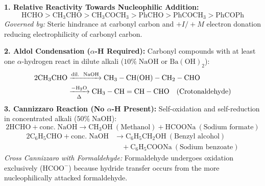 \documentclass[10pt,twoside,openright]{book}
\begin{document}
\begin{formulabox}
\textbf{1. Relative Reactivity Towards Nucleophilic Addition:}
\begin{equation}
  \mathrm{HCHO} > \mathrm{CH_3CHO} > \mathrm{CH_3COCH_3} > \mathrm{PhCHO} > \mathrm{PhCOCH_3} > \mathrm{PhCOPh}
\end{equation}
\textit{Governed by:} Steric hindrance at carbonyl carbon and $+I / +M$ electron donation reducing electrophilicity of carbonyl carbon.

\textbf{2. Aldol Condensation ($\alpha$-H Required):}
Carbonyl compounds with at least one $\alpha$-hydrogen react in dilute alkali ($10\%\; \mathrm{NaOH}$ or $\mathrm{Ba(OH)}_2$):
\begin{align}
  2\mathrm{CH_3CHO} &\xrightarrow{\text{dil.\; NaOH}} \mathrm{CH_3-CH(OH)-CH_2-CHO} \nonumber\\
  &\xrightarrow[\Delta]{-\mathrm{H_2O}} \mathrm{CH_3-CH=CH-CHO} \quad (\text{Crotonaldehyde})
\end{align}
\textbf{3. Cannizzaro Reaction (No $\alpha$-H Present):}
Self-oxidation and self-reduction in concentrated alkali ($50\%\; \mathrm{NaOH}$):
\begin{equation}
  2\mathrm{HCHO} + \mathrm{conc.\; NaOH} \longrightarrow \mathrm{CH_3OH} \ (\text{Methanol}) + \mathrm{HCOONa} \ (\text{Sodium formate})
\end{equation}
\begin{align}
  2\mathrm{C_6H_5CHO} + \mathrm{conc.\; NaOH} &\longrightarrow \mathrm{C_6H_5CH_2OH} \ (\text{Benzyl alcohol}) \nonumber\\
  &\quad + \mathrm{C_6H_5COONa} \ (\text{Sodium benzoate})
\end{align}
\textit{Cross Cannizzaro with Formaldehyde:} Formaldehyde undergoes oxidation exclusively ($\mathrm{HCOO}^-$) because hydride transfer occurs from the more nucleophilically attacked formaldehyde.
\end{formulabox}
\end{document}
